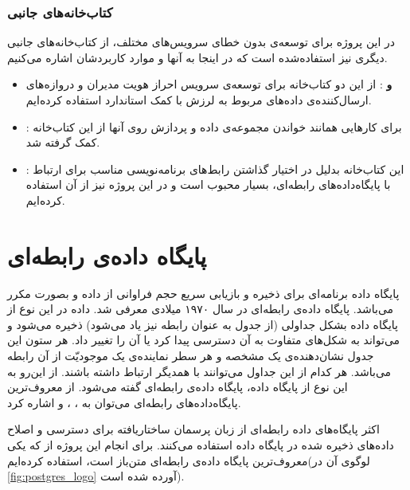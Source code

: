 \subsubsection{کتاب‌خانه‌‌های جانبی}
در این پروژه برای توسعه‌ی بدون خطای سرویس‌های مختلف، از کتاب‌خانه‌های جانبی دیگری نیز استفاده‌شده است که در اینجا به آنها و موارد کاربردشان اشاره می‌کنیم.
\begin{itemize}

\item \textbf{ و }: از این دو کتاب‌خانه برای توسعه‌ی سرویس احراز هویت مدیران و دروازه‌های ارسال‌کننده‌ی داده‌های مربوط به لرزش با کمک استاندارد  استفاده کرده‌ایم.

\item \textbf{}: برای کارهایی همانند خواندن مجموعه‌ی داده و پردازش روی آنها از این کتاب‌خانه کمک گرفته شد.

\item \textbf{}: این کتاب‌خانه بدلیل در اختیار گذاشتن رابط‌های برنامه‌نویسی مناسب برای ارتباط با پایگاه‌داده‌های رابطه‌ای، بسیار محبوب است و در این پروژه نیز از آن استفاده کرده‌ایم.

\end{itemize}


\section{پایگاه داده‌ی رابطه‌ای}
پایگاه داده برنامه‌ای برای ذخیره و بازیابی سریع حجم فراوانی از داده و بصورت مکرر می‌باشد. پایگاه داده‌ی رابطه‌ای در سال ۱۹۷۰ میلادی معرفی شد. داده در این نوع از پایگاه داده بشکل جداولی (از جدول به عنوان رابطه نیز یاد می‌شود) ذخیره می‌شود و می‌تواند به شکل‌های متفاوت به آن دسترسی پیدا کرد یا آن را تغییر داد. هر ستون این جدول نشان‌دهنده‌ی یک مشخصه و هر سطر نماینده‌ی یک موجودیّت از آن رابطه می‌باشد. هر کدام از این جداول می‌توانند با همدیگر ارتباط داشته‌ باشند. از این‌رو به این نوع از پایگاه داده، پایگاه داده‌ی رابطه‌ای گفته می‌شود\cite{jatana2012survey}. از معروف‌ترین پایگاه‌داده‌های رابطه‌ای می‌توان به ، ،  و  اشاره کرد.

اکثر پایگاه‌های داده رابطه‌ای از زبان پرسمان ساختاریافته برای دسترسی و اصلاح داده‌های ذخیره شده در پایگاه داده استفاده می‌کنند. برای انجام این پروژه از \href{https://www.postgresql.org/}{} که یکی معروف‌ترین پایگاه‌ داده‌ی رابطه‌ای متن‌باز است، استفاده کرده‌ایم(لوگوی آن در \cref{fig:postgres_logo}\cite{postgresqlPostgreSQL} آورده شده است).

